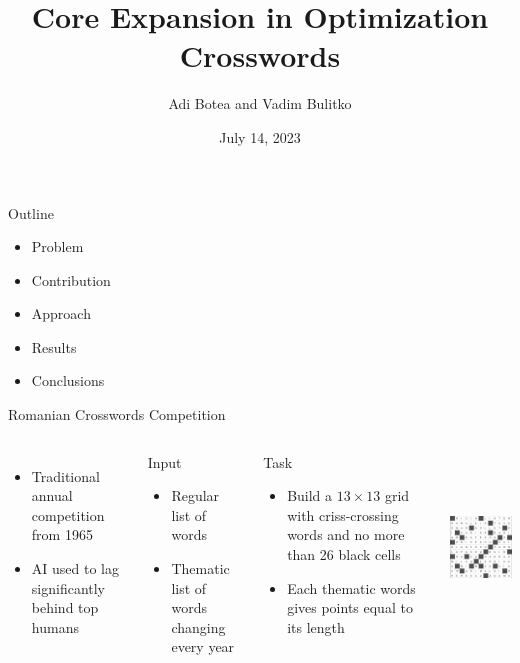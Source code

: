 \documentclass[aspectratio=169,usenames,dvipsnames]{beamer}
\newcommand{\bei}{\begin{itemize}}
\newcommand{\eei}{\end{itemize}}
\newcommand{\ie}{\item}
\numberwithin{equation}{section}
\numberwithin{theorem}{section}
\numberwithin{lem}{section}
\numberwithin{df}{section}
\begin{document}
\title{Core Expansion in Optimization Crosswords}
\author{Adi Botea and Vadim Bulitko}

\date{July 14, 2023}

\frame{\titlepage} 


\begin{frame}{Outline}

\bei

\ie Problem

\bigskip

\ie Contribution

\bigskip

\ie Approach

\bigskip

\ie Results

\bigskip

\ie Conclusions

\eei

\end{frame}


\begin{frame}{Romanian Crosswords Competition}

\begin{columns}
\bei
\ie Traditional annual competition from 1965
\ie AI used to lag significantly behind top humans
\eei

\begin{block}{Input}
\bei 
\ie Regular list of words
\ie Thematic list of words changing every year
\eei
\end{block}

\begin{block}{Task}
\bei 
\ie Build a $13\times13$ grid with criss-crossing words and no more than 26 black cells
\ie Each thematic words gives points equal to its length
\eei
\end{block}

\includegraphics[height=5cm]{2013b.png}
\end{columns}
\end{frame}
\end{document}
